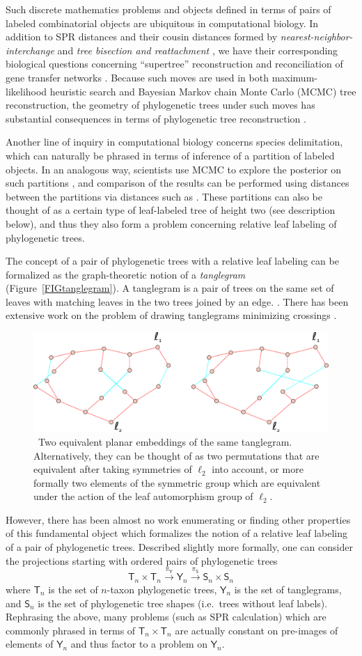 \documentclass{amsart}
\newcommand{\tree}{\mathsf{T}}
\newcommand{\shape}{\mathsf{S}}
\newcommand{\tangle}{\mathsf{Y}}
\newcommand{\arxiv}[1]{#1}
\newcommand{\FIGtanglegram}{\
\label{FIGtanglegram}
\begin{figure}
  \arxiv{\includegraphics[width=5in]{figures/relabeling-example}}
\caption{\
  Two equivalent planar embeddings of the same tanglegram.
  Alternatively, they can be thought of as two permutations that are equivalent after taking symmetries of $\ell_2$ into account, or more formally two elements of the symmetric group which are equivalent under the action of the leaf automorphism group of $\ell_2$.
}
\end{figure}
}
\begin{document}
Such discrete mathematics problems and objects defined in terms of pairs of labeled combinatorial objects are ubiquitous in computational biology.
In addition to SPR distances and their cousin distances formed by \emph{nearest-neighbor-interchange} and \emph{tree bisection and reattachment} \cite{wiki:treeRearrangement}, we have their corresponding biological questions concerning ``supertree'' reconstruction \cite{Whidden2014-ku} and reconciliation of gene transfer networks \cite{Boon2013-mc}.
Because such moves are used in both maximum-likelihood heuristic search and Bayesian Markov chain Monte Carlo (MCMC) tree reconstruction, the geometry of phylogenetic trees under such moves has substantial consequences in terms of phylogenetic tree reconstruction \cite{Whidden2014-yt}.

Another line of inquiry in computational biology concerns species delimitation, which can naturally be phrased in terms of inference of a partition of labeled objects.
In an analogous way, scientists use MCMC to explore the posterior on such partitions \cite{Yang2010-kc}, and comparison of the results can be performed using distances between the partitions via distances such as \cite{Gusfield2002-il}.
These partitions can also be thought of as a certain type of leaf-labeled tree of height two (see description below), and thus they also form a problem concerning relative leaf labeling of phylogenetic trees.

The concept of a pair of phylogenetic trees with a relative leaf labeling can be formalized as the graph-theoretic notion of a \emph{tanglegram} (Figure~\ref{FIGtanglegram}).
A tanglegram is a pair of trees on the same set of leaves with matching leaves in the two trees joined by an edge. \cite{Venkatachalam2010-zh}.
There has been extensive work on the problem of drawing tanglegrams minimizing crossings \cite{Buchin2008-lc,Lozano2008-tp,Bansal2009-ni,Bocker2009-xl,Fernau2010-an,Venkatachalam2010-zh}.
\FIGtanglegram

However, there has been almost no work enumerating or finding other properties of this fundamental object which formalizes the notion of a relative leaf labeling of a pair of phylogenetic trees.
Described slightly more formally, one can consider the projections starting with ordered pairs of phylogenetic trees
\begin{equation}
\label{eq:projChain}
\tree_n \times \tree_n \xrightarrow{\pi_\tangle} \tangle_n \xrightarrow{\pi_\shape} \shape_n \times \shape_n
\end{equation}
where $\tree_n$ is the set of $n$-taxon phylogenetic trees, $\tangle_n$ is the set of tanglegrams, and $\shape_n$ is the set of phylogenetic tree shapes (i.e.\ trees without leaf labels).
Rephrasing the above, many problems (such as SPR calculation) which are commonly phrased in terms of $\tree_n \times \tree_n$ are actually constant on pre-images of elements of $\tangle_n$ and thus factor to a problem on $\tangle_n$.
\end{document}
